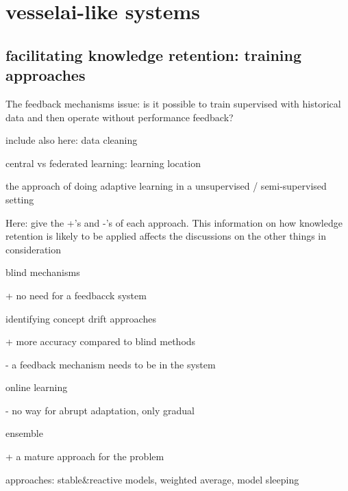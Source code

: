 


\chapter{vesselai-like systems}

\section{facilitating knowledge retention: training approaches}

The feedback mechanisms issue: is it possible to train supervised with historical data and then operate without performance feedback?

include also here: data cleaning

central vs federated learning: learning location

the approach of doing adaptive learning in a unsupervised / semi-supervised setting

Here: give the +'s and -'s of each approach. This information on how knowledge retention is likely to be applied affects the discussions on the other things in consideration

blind mechanisms

+ no need for a feedbacck system

identifying concept drift approaches

+ more accuracy compared to blind methods \cite{conceptdriftsurvey}

- a feedback mechanism needs to be in the system

online learning

- no way for abrupt adaptation, only gradual \cite{conceptdriftsurvey}

ensemble

+ a mature approach for the problem \cite{mlforstreamingsurvey}

approaches: stable&reactive models, weighted average, model sleeping \cite{conceptdriftsurvey}


